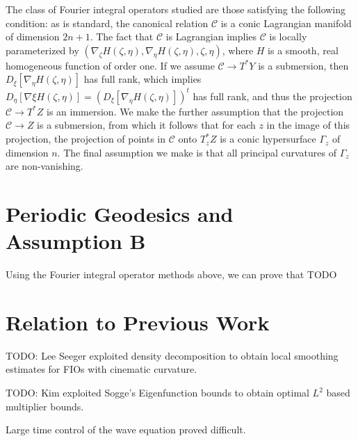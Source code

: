The class of Fourier integral operators studied are those satisfying the following condition: as is standard, the canonical relation $\mathcal{C}$ is a conic Lagrangian manifold of dimension $2n + 1$. The fact that $\mathcal{C}$ is Lagrangian implies $\mathcal{C}$ is locally parameterized by $(\nabla_\zeta H(\zeta, \eta), \nabla_\eta H(\zeta, \eta),\zeta,\eta)$, where $H$ is a smooth, real homogeneous function of order one. If we assume $\mathcal{C} \to T^* Y$ is a submersion, then $D_\xi [\nabla_\eta H(\zeta,\eta)]$ has full rank, which implies $D_\eta [\nabla \xi H(\zeta, \eta)] = (D_\xi [\nabla_\eta H(\zeta, \eta)])^t$ has full rank, and thus the projection $\mathcal{C} \to T^* Z$ is an immersion. We make the further assumption that the projection $\mathcal{C} \to Z$ is a submersion, from which it follows that for each $z$ in the image of this projection, the projection of points in $\mathcal{C}$ onto $T^*_z Z$ is a conic hypersurface $\Gamma_z$ of dimension $n$. The final assumption we make is that all principal curvatures of $\Gamma_z$ are non-vanishing.

\section{Periodic Geodesics and Assumption B}

Using the Fourier integral operator methods above, we can prove that TODO

\section{Relation to Previous Work}

TODO: Lee Seeger exploited density decomposition to obtain local smoothing estimates for FIOs with cinematic curvature.

TODO: Kim exploited Sogge's Eigenfunction bounds to obtain optimal $L^2$ based multiplier bounds.

Large time control of the wave equation proved difficult.